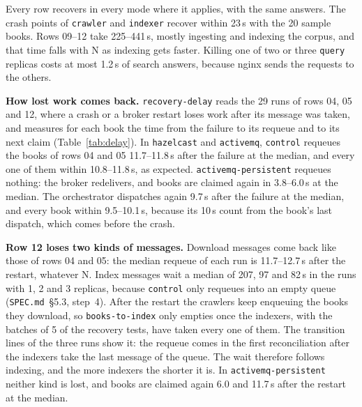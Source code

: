 \documentclass[11pt,a4paper]{article}
\newcommand{\code}[1]{\nolinkurl{#1}}
\newcommand{\mode}[1]{\code{#1}}
\newcommand{\spec}[1]{\code{SPEC.md}~\S#1}
\begin{document}
Every row recovers in every mode where it applies, with the same answers. The crash points of \code{crawler} and
\code{indexer} recover within 23\,s with the 20 sample books. Rows 09--12 take 225--441\,s, mostly ingesting and
indexing the corpus, and that time falls with N as indexing gets faster. Killing one of two or three \code{query}
replicas costs at most 1.2\,s of search answers, because nginx sends the requests to the others.

\textbf{How lost work comes back.} \code{recovery-delay} reads the 29 runs of rows 04, 05 and 12, where a crash or a
broker restart loses work after its message was taken, and measures for each book the time from the failure to its
requeue and to its next claim (Table~\ref{tab:delay}). In \mode{hazelcast} and \mode{activemq}, \code{control} requeues
the books of rows 04 and 05 11.7--11.8\,s after the failure at the median, and every one of them within
10.8--11.8\,s, as expected. \mode{activemq-persistent} requeues nothing: the broker redelivers, and books are claimed
again in 3.8--6.0\,s at the median. The orchestrator dispatches again 9.7\,s after the failure at the median, and every
book within 9.5--10.1\,s, because its 10\,s count from the book's last dispatch, which comes before the crash.

\textbf{Row 12 loses two kinds of messages.} Download messages come back like those of rows 04 and 05: the median
requeue of each run is 11.7--12.7\,s after the restart, whatever N. Index messages wait a median of 207, 97 and 82\,s
in the runs with 1, 2 and 3 replicas, because \code{control} only requeues into an empty queue (\spec{5.3}, step~4).
After the restart the crawlers keep enqueuing the books they download, so \code{books-to-index} only empties once the
indexers, with the batches of 5 of the recovery tests, have taken every one of them. The transition lines of the
three runs show it: the requeue comes in the first reconciliation after the indexers take the last message of the
queue. The wait therefore follows indexing, and the more indexers the shorter it is. In \mode{activemq-persistent}
neither kind is lost, and books are claimed again 6.0 and 11.7\,s after the restart at the median.
\end{document}
